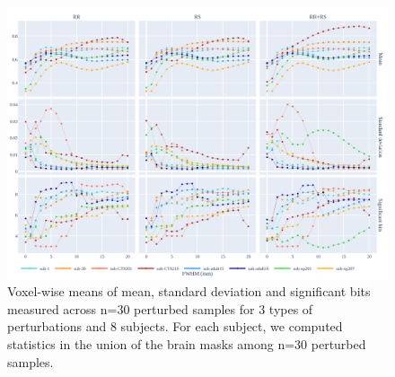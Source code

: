 \documentclass{article}
\begin{document}
\begin{figure}
    \centering
    \includegraphics[width=\linewidth]{figures/stats.pdf}
    \caption{Voxel-wise means of mean, standard deviation and significant bits
        measured across n=30 perturbed samples for 3 types of perturbations and 8
        subjects. For each subject, we computed statistics in the union of the brain
        masks among n=30 perturbed samples.}
    \label{fig:significant-digits}
\end{figure}
\end{document}
